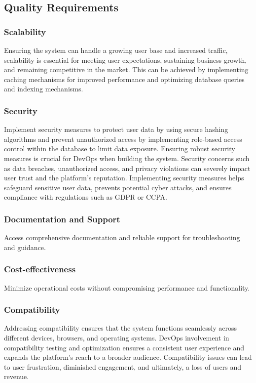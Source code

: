 \documentclass[a4paper,12pt]{article}
\begin{document}
\subsection{Quality Requirements}
\label{subsec:quality-requirements}

\subsubsection{Scalability}
Ensuring the system can handle a growing user base and increased traffic, scalability is essential for 
meeting user expectations, sustaining business growth, and remaining competitive in the market. This can 
be achieved by implementing caching mechanisms for improved performance and optimizing database queries and indexing mechanisms.

\subsubsection{Security}
Implement security measures to protect user data by using secure hashing algorithms and prevent unauthorized 
access by implementing role-based access control within the database to limit data exposure. Ensuring robust 
security measures is crucial for DevOps when building the system. Security concerns such as data breaches, 
unauthorized access, and privacy violations can severely impact user trust and the platform’s reputation. 
Implementing security measures helps safeguard sensitive user data, prevents potential cyber attacks, and 
ensures compliance with regulations such as GDPR or CCPA.

\subsubsection{Documentation and Support}
Access comprehensive documentation and reliable support for troubleshooting and guidance.

\subsubsection{Cost-effectiveness}
Minimize operational costs without compromising performance and functionality.

\subsubsection{Compatibility}
Addressing compatibility ensures that the system functions seamlessly across different devices, browsers, 
and operating systems. DevOps involvement in compatibility testing and optimization ensures a consistent 
user experience and expands the platform’s reach to a broader audience. Compatibility issues can lead to 
user frustration, diminished engagement, and ultimately, a loss of users and revenue.
\end{document}
